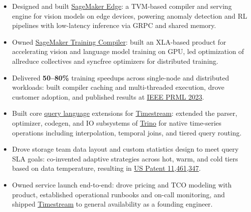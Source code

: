 \documentclass[11pt,letterpaper,sans]{resume}
\begin{document}
\begin{itemize}
\item Designed and built \href{https://aws.amazon.com/sagemaker/edge/}{SageMaker Edge}: a TVM-based compiler and serving engine for vision models on edge devices, powering anomaly detection and RL pipelines with low-latency inference via GRPC and shared memory.
\item Owned \href{https://docs.aws.amazon.com/sagemaker/latest/dg/training-compiler.html}{SageMaker Training Compiler}: built an XLA-based product for accelerating vision and language model training on GPU, led optimization of allreduce collectives and syncfree optimizers for distributed training.
\item Delivered \textbf{50--80\%} training speedups across single-node and distributed workloads: built compiler caching and multi-threaded execution, drove customer adoption, and published results at \href{https://ieeexplore.ieee.org/document/10348258/}{IEEE PRML 2023}.
\end{itemize}

\begin{itemize}
\item Built core \href{https://docs.aws.amazon.com/timestream/latest/developerguide/reference.html}{query language} extensions for \href{https://aws.amazon.com/timestream/}{Timestream}: extended the parser, optimizer, codegen, and IO subsystems of \href{https://trino.io}{Trino} for native time-series operations including interpolation, temporal joins, and tiered query routing.
\item Drove storage team data layout and custom statistics design to meet query SLA goals: co-invented adaptive strategies across hot, warm, and cold tiers based on data temperature, resulting in \href{https://patents.google.com/patent/US11461347B1/en}{US Patent 11,461,347}.
\item Owned service launch end-to-end: drove pricing and TCO modeling with product, established operational runbooks and on-call monitoring, and shipped \href{https://aws.amazon.com/timestream/}{Timestream} to general availability as a founding engineer.
\end{itemize}
\end{document}
